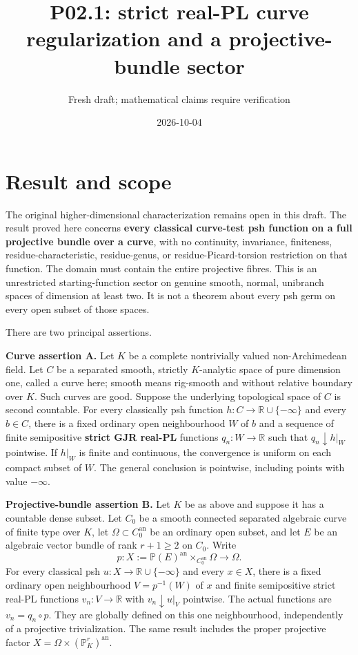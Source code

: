 \documentclass[
  11pt,
]{article}
\title{P02.1: strict real-PL curve regularization and a
projective-bundle sector}
\author{Fresh draft; mathematical claims require verification}
\date{2026-10-04}
\begin{document}
\maketitle

\section{Result and scope}\label{result-and-scope}

The original higher-dimensional characterization remains open in this
draft. The result proved here concerns \textbf{every classical
curve-test psh function on a full projective bundle over a curve}, with
no continuity, invariance, finiteness, residue-characteristic,
residue-genus, or residue-Picard-torsion restriction on that function.
The domain must contain the entire projective fibres. This is an
unrestricted starting-function sector on genuine smooth, normal,
unibranch spaces of dimension at least two. It is not a theorem about
every psh germ on every open subset of those spaces.

There are two principal assertions.

\textbf{Curve assertion A.} Let \(K\) be a complete nontrivially valued
non-Archimedean field. Let \(C\) be a separated smooth, strictly
\(K\)-analytic space of pure dimension one, called a curve here; smooth
means rig-smooth and without relative boundary over \(K\). Such curves
are good. Suppose the underlying topological space of \(C\) is second
countable. For every classically psh function
\(h:C\to\mathbb R\cup\{-\infty\}\) and every \(b\in C\), there is a
fixed ordinary open neighbourhood \(W\) of \(b\) and a sequence of
finite semipositive \textbf{strict GJR real-PL} functions
\(q_n:W\to\mathbb R\) such that \(q_n\downarrow h|_W\) pointwise. If
\(h|_W\) is finite and continuous, the convergence is uniform on each
compact subset of \(W\). The general conclusion is pointwise, including
points with value \(-\infty\).

\textbf{Projective-bundle assertion B.} Let \(K\) be as above and
suppose it has a countable dense subset. Let \(C_0\) be a smooth
connected separated algebraic curve of finite type over \(K\), let
\(\Omega\subset C_0^{\mathrm{an}}\) be an ordinary open subset, and let
\(E\) be an algebraic vector bundle of rank \(r+1\geq2\) on \(C_0\).
Write
\[p:X:=\mathbb P(E)^{\mathrm{an}}\times_{C_0^{\mathrm{an}}}\Omega\longrightarrow\Omega.\]
For every classical psh \(u:X\to\mathbb R\cup\{-\infty\}\) and every
\(x\in X\), there is a fixed ordinary open neighbourhood \(V=p^{-1}(W)\)
of \(x\) and finite semipositive strict real-PL functions
\(v_n:V\to\mathbb R\) with \(v_n\downarrow u|_V\) pointwise. The actual
functions are \(v_n=q_n\circ p\). They are globally defined on this one
neighbourhood, independently of a projective trivialization. The same
result includes the proper projective factor
\(X=\Omega\times(\mathbb P_K^r)^{\mathrm{an}}\).
\end{document}
